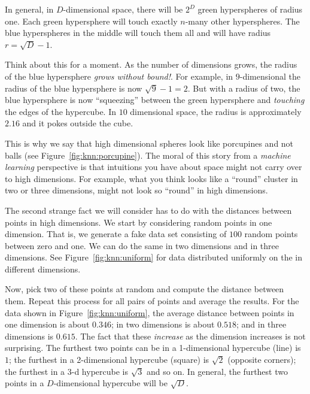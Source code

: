 In general, in $D$-dimensional space, there will be $2^D$ green
hyperspheres of radius one.  Each green hypersphere will touch exactly
$n$-many other hyperspheres.  The blue hyperspheres in the middle will
touch them all and will have radius $r = \sqrt D - 1$.

Think about this for a moment.  As the number of dimensions grows, the
radius of the blue hypersphere \emph{grows without bound!}.  For
example, in $9$-dimensional the radius of the blue hypersphere is now
$\sqrt9-1 = 2$.  But with a radius of two, the blue hypersphere is now
``squeezing'' between the green hypersphere and \emph{touching} the
edges of the hypercube.  In $10$ dimensional space, the radius is
approximately $2.16$ and it pokes outside the cube.


This is why we say that high dimensional spheres look like porcupines
and not balls (see Figure~\ref{fig:knn:porcupine}).  The moral of this
story from a \emph{machine learning} perspective is that intuitions
you have about space might not carry over to high dimensions.  For
example, what you think looks like a ``round'' cluster in two or three
dimensions, might not look so ``round'' in high dimensions.


The second strange fact we will consider has to do with the distances
between points in high dimensions.  We start by considering random
points in one dimension.  That is, we generate a fake data set
consisting of $100$ random points between zero and one.  We can do the
same in two dimensions and in three dimensions.  See
Figure~\ref{fig:knn:uniform} for data distributed uniformly on the
 in different dimensions.

Now, pick two of these points at random and compute the distance
between them.  Repeat this process for all pairs of points and average
the results.  For the data shown in Figure~\ref{fig:knn:uniform}, the
average distance between points in one dimension is about $0.346$; in two
dimensions is about $0.518$; and in three dimensions is $0.615$. The fact that these \emph{increase} as the dimension increases is not surprising. The furthest two points can be in a 1-dimensional hypercube (line) is $1$; the furthest in a 2-dimensional hypercube (square) is $\sqrt 2$ (opposite corners); the furthest in a 3-d hypercube is $\sqrt 3$ and so on. In general, the furthest two points in a $D$-dimensional hypercube will be $\sqrt D$.

